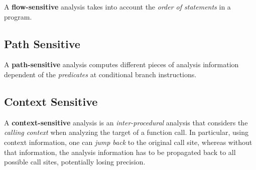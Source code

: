 A \textbf{flow-sensitive} analysis takes into account the
\textit{order of statements} in a program.

\subsection{Path Sensitive}
\label{sec:path-sensitive}

A \textbf{path-sensitive} analysis computes different pieces of
analysis information dependent of the \textit{predicates} at
conditional branch instructions.

\subsection{Context Sensitive}
\label{sec:context-sensitive}

A \textbf{context-sensitive} analysis is an \textit{inter-procedural}
analysis that considers the \textit{calling context} when analyzing
the target of a function call. In particular, using context
information, one can \textit{jump back} to the original call site,
whereas without that information, the analysis information has to be
propagated back to all possible call sites, potentially losing
precision.


